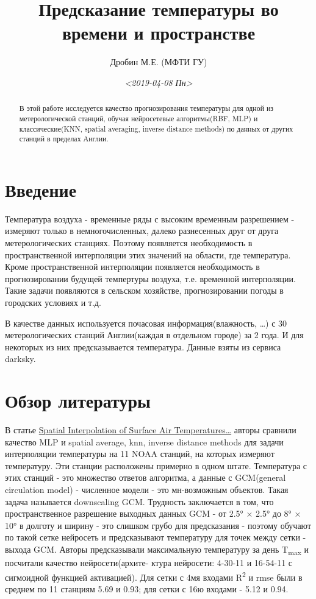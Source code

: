 \documentclass[11pt]{article}
\author{Дробин М.Е. (МФТИ ГУ)}
\date{\textit{<2019-04-08 Пн>}}
\title{Предсказание температуры во времени и пространстве}
\begin{document}
\maketitle
\tableofcontents

\begin{abstract}
В этой работе исследуется качество прогнозирования температуры для одной из метерологической станций, обучая нейросетевые алгоритмы(RBF, MLP) и
классические(KNN, spatial averaging, inverse distance methods) по данных от других станций в пределах Англии.
\end{abstract}

\section{Введение}
\label{sec:orgbc64d6d}
Температура воздуха - временные ряды с высоким временным разрешением - измеряют только в немногочисленных, далеко
разнесенных друг от друга метерологических станциях.  Поэтому появляется необходимость в пространственной интерполяции
этих значений на области, где температура. Кроме пространственной интерполяции появляется необходимость в
прогнозировании будущей темпертуры воздуха, т.е. временной интерполяции. Такие задачи появляются в сельском хозяйстве,
прогнозировании погоды в городских условиях и т.д.

В качестве данных используется почасовая информация(влажность, \ldots{}) с 30 метерологических станций Англии(каждая в
отдельном городе) за 2 года. И для некоторых из них предсказывается температура. Данные взяты из сервиса darksky.
\section{Обзор литературы}
\label{sec:org288e0ca}
В статье \href{https://journals.ametsoc.org/doi/pdf/10.1175/1520-0442\%282000\%29013\%3C0886\%3ASIOSAT\%3E2.0.CO\%3B2}{Spatial Interpolation of Surface Air Temperatures\ldots{}} авторы сравнили качество MLP и spatial average, knn, 
inverse distance methods для задачи интерполяции температуры на 11 NOAA станций, на которых измеряют температуру. Эти станции расположены
примерно в одном штате. Температура с этих станций - это множество ответов алгоритма, а данные с GCM(general circulation model) - численное модели - это мн-возможным
объектов. Такая задача называется downscaling GCM. Трудность заключается в том,  что пространственное разрешение выходных данных GCM - 
от 2.5° × 2.5° до 8° × 10° в долготу и ширину - это слишком грубо для предсказания - поэтому обучают по такой сетке нейросеть и предсказывают
температуру для точек между сетки - выхода  GCM. Авторы предсказывали максимальную температуру за день T\textsubscript{max} и посчитали качество нейросети(архите-
ктура нейросети: 4-30-11 и 16-54-11 с сигмоидной функцией активацией). Для сетки с 4мя входами R\textsuperscript{2} и rmse были в среднем по 11 станциям 5.69 и 0.93; для сетки с 16ю входами - 5.12 и 0.94.
\end{document}
